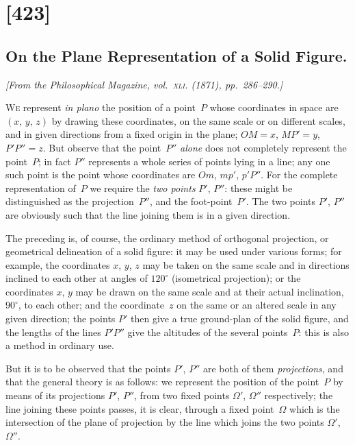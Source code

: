 \documentclass[11pt,a4paper]{article}
\theoremstyle{plain}
\theoremstyle{definition}
\begin{document}
\section{[423]}
\subsection{On the Plane Representation of a Solid Figure.}

\begin{center}
\textit{[From the Philosophical Magazine, vol.~\textsc{xli}. (1871), pp.~286--290.]}
\end{center}

\textsc{We} represent \textit{in plano} the position of a point~$P$ whose coordinates in space are
$(x,\,y,\,z)$ by drawing these coordinates, on the same scale or on different scales, and
in given directions from a fixed origin in the plane; $OM = x$, $MP' = y$, $P'P'' = z$.  But
observe that the point~$P''$ \textit{alone} does not completely represent the point~$P$; in fact
$P''$ represents a whole series of points lying in a line; any one such point is the
point whose coordinates are $Om$, $mp'$, $p'P''$.  For the complete representation of~$P$ we
require the \textit{two points} $P'$, $P''$: these might be distinguished as the projection~$P''$, and
the foot-point~$P'$.  The two points $P'$, $P''$ are obviously such that the line joining them
is in a given direction.

The preceding is, of course, the ordinary method of orthogonal projection, or
geometrical delineation of a solid figure: it may be used under various forms; for
example, the coordinates $x$, $y$, $z$ may be taken on the same scale and in directions
inclined to each other at angles of $120^\circ$ (isometrical projection); or the coordinates $x$, $y$
may be drawn on the same scale and at their actual inclination, $90^\circ$, to each other;
and the coordinate~$z$ on the same or an altered scale in any given direction; the
points $P'$ then give a true ground-plan of the solid figure, and the lengths of the
lines $P'P''$ give the altitudes of the several points~$P$: this is also a method in
ordinary use.

But it is to be observed that the points $P'$, $P''$ are both of them \textit{projections},
and that the general theory is as follows: we represent the position of the point~$P$
by means of its projections $P'$, $P''$, from two fixed points $\Omega'$, $\Omega''$ respectively; the
line joining these points passes, it is clear, through a fixed point~$\Omega$ which is the
intersection of the plane of projection by the line which joins the two points $\Omega'$, $\Omega''$.
\end{document}
